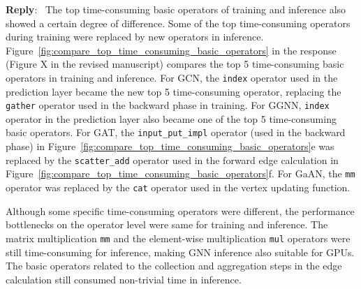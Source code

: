 \documentclass[12pt]{article}
\newenvironment{reply}
   {\medskip \noindent \textbf{Reply}:\  }
   {\medskip}
\begin{document}
\begin{reply}
    The top time-consuming basic operators of training and inference also showed a certain degree of difference.
    Some of the top time-consuming operators during training were replaced by new operators in inference.
    Figure~\ref{fig:compare_top_time_consuming_basic_operators} in the response (Figure X in the revised manuscript) compares the top 5 time-consuming basic operators in training and inference.
    For GCN, the \texttt{index} operator used in the prediction layer became the new top 5 time-consuming operator, replacing the \texttt{gather} operator used in the backward phase in training.
    For GGNN, \texttt{index} operator in the prediction layer also became one of the top 5 time-consuming basic operators.
    For GAT, the \texttt{input\_put\_impl} operator (used in the backward phase) in Figure~\ref{fig:compare_top_time_consuming_basic_operators}e was replaced by the \texttt{scatter\_add} operator used in the forward edge calculation in Figure~\ref{fig:compare_top_time_consuming_basic_operators}f.
    For GaAN, the \texttt{mm} operator was replaced by the \texttt{cat} operator used in the vertex updating function.
    
    Although some specific time-consuming operators were different, the performance bottlenecks on the operator level were same for training and inference.
    The matrix multiplication \texttt{mm} and the element-wise multiplication \texttt{mul} operators were still time-consuming for inference, making GNN inference also {suitable for GPUs}.
    The basic operators related to the collection and aggregation steps in the edge calculation still consumed non-trivial time in inference.
    

\end{reply}
\end{document}
